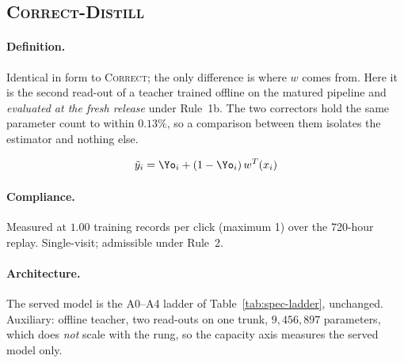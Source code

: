 \subsection{\textsc{Correct-Distill}}\label{app:m-DISTILL-Tmlp}

\paragraph{Definition.} Identical in form to \textsc{Correct}; the only difference is where $w$ comes from.
   Here it is the second read-out of a teacher trained offline on the matured pipeline and
   \emph{evaluated at the fresh release} under Rule~1b. The two correctors hold the same parameter
   count to within $0.13\%$, so a comparison between them isolates the estimator and nothing
   else.

\begin{equation}
\tilde y_i = \Yo_i + (1-\Yo_i)\,w^{T}(x_i)
\end{equation}

\begin{center}\end{center}

\paragraph{Compliance.} Measured at $1.00$ training records per click (maximum 1) over the 720-hour replay. Single-visit; admissible under Rule~2.

\paragraph{Architecture.} The served model is the A0--A4 ladder of Table~\ref{tab:spec-ladder}, unchanged. Auxiliary: offline teacher, two read-outs on one trunk, $9{,}456{,}897$ parameters, which does \emph{not} scale with the rung, so the capacity axis measures the served model only.

